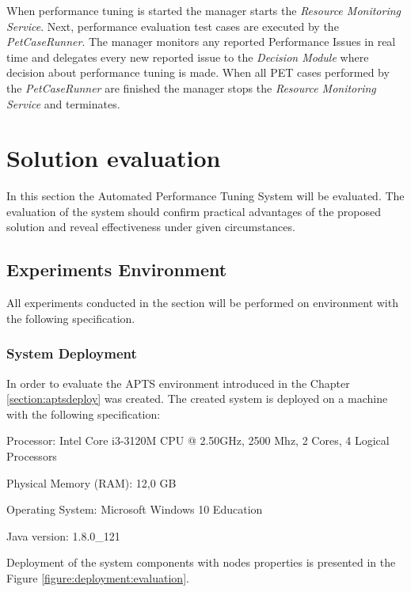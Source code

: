 \documentclass[12pt,a4paper]{article}
\let\tempone\itemize
\let\temptwo\enditemize
\renewenvironment{itemize}{\tempone\addtolength{\itemsep}{-0.4\baselineskip}}{\temptwo}
\begin{document}
When performance tuning is started the manager starts the \textit{Resource Monitoring Service}. Next, performance evaluation test cases are executed by the \textit{PetCaseRunner}. The manager monitors any reported Performance Issues in real time and delegates every new reported issue to the \textit{Decision Module} where decision about performance tuning is made. When all PET cases performed by the \textit{PetCaseRunner} are finished the manager stops the \textit{Resource Monitoring Service} and terminates. 

\section{Solution evaluation}  \label{section:solutionevaluation}

In this section the Automated Performance Tuning System will be evaluated. The evaluation of the system should confirm practical advantages of the proposed solution and reveal effectiveness under given circumstances. 

\subsection{Experiments Environment}

All experiments conducted in the section will be performed on environment with the following specification.

\subsubsection{System Deployment} \label{section:systemdeployment}

In order to evaluate the APTS environment introduced in the Chapter \ref{section:aptsdeploy} was created.
The created system is deployed on a machine with the following specification:
\begin{itemize}
\item Processor: Intel Core i3-3120M CPU @ 2.50GHz, 2500 Mhz, 2 Cores, 4 Logical Processors
\item Physical Memory (RAM): 12,0 GB
\item Operating System: Microsoft Windows 10 Education
\item Java version: 1.8.0\_121
\end{itemize}

Deployment of the system components with nodes properties is presented in the Figure \ref{figure:deployment:evaluation}. 
\end{document}
